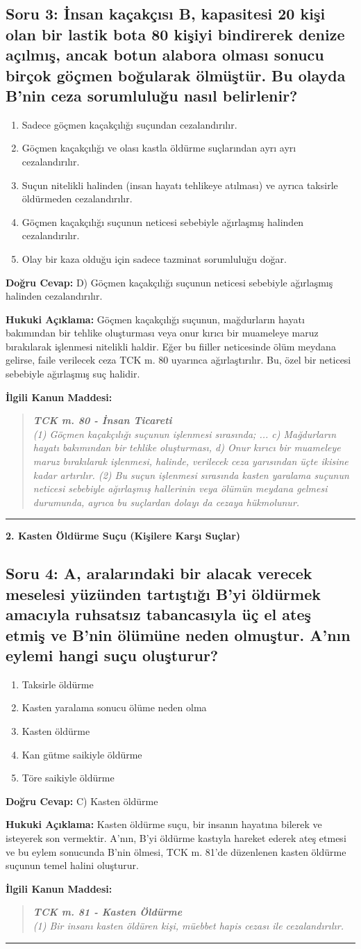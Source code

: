 \documentclass[12pt, a4paper]{article}
\newcommand{\topic}[1]{\par\vspace{4mm}\noindent\large\textbf{#1}\par\vspace{1mm}\nopagebreak}
\newcommand{\question}[1]{\subsection*{#1}}
\newcommand{\options}[5]{
    \begin{enumerate}[label=\Alph*)]
        \item #1
        \item #2
        \item #3
        \item #4
        \item #5
    \end{enumerate}
}
\newcommand{\answer}[3]{
    \vspace{5mm}
    \noindent\textbf{Doğru Cevap:} #1
    \vspace{3mm}
    
    \noindent\textbf{Hukuki Açıklama:} #2
    \vspace{3mm}
    
    \noindent\textbf{İlgili Kanun Maddesi:}
    \begin{quotation}
        \small
        \textit{#3}
    \end{quotation}
    \vspace{5mm}
    \hrule
}
\begin{document}
\question{Soru 3: İnsan kaçakçısı B, kapasitesi 20 kişi olan bir lastik bota 80 kişiyi bindirerek denize açılmış, ancak botun alabora olması sonucu birçok göçmen boğularak ölmüştür. Bu olayda B'nin ceza sorumluluğu nasıl belirlenir?}
\options
{Sadece göçmen kaçakçılığı suçundan cezalandırılır.}
{Göçmen kaçakçılığı ve olası kastla öldürme suçlarından ayrı ayrı cezalandırılır.}
{Suçun nitelikli halinden (insan hayatı tehlikeye atılması) ve ayrıca taksirle öldürmeden cezalandırılır.}
{Göçmen kaçakçılığı suçunun neticesi sebebiyle ağırlaşmış halinden cezalandırılır.}
{Olay bir kaza olduğu için sadece tazminat sorumluluğu doğar.}
\answer{D) Göçmen kaçakçılığı suçunun neticesi sebebiyle ağırlaşmış halinden cezalandırılır.}
{Göçmen kaçakçılığı suçunun, mağdurların hayatı bakımından bir tehlike oluşturması veya onur kırıcı bir muameleye maruz bırakılarak işlenmesi nitelikli haldir. Eğer bu fiiller neticesinde ölüm meydana gelirse, faile verilecek ceza TCK m. 80 uyarınca ağırlaştırılır. Bu, özel bir neticesi sebebiyle ağırlaşmış suç halidir.}
{\textbf{TCK m. 80 - İnsan Ticareti} \\ (1) Göçmen kaçakçılığı suçunun işlenmesi sırasında; ... c) Mağdurların hayatı bakımından bir tehlike oluşturması, d) Onur kırıcı bir muameleye maruz bırakılarak işlenmesi, halinde, verilecek ceza yarısından üçte ikisine kadar artırılır. (2) Bu suçun işlenmesi sırasında kasten yaralama suçunun neticesi sebebiyle ağırlaşmış hallerinin veya ölümün meydana gelmesi durumunda, ayrıca bu suçlardan dolayı da cezaya hükmolunur.}

\topic{2. Kasten Öldürme Suçu (Kişilere Karşı Suçlar)}
\question{Soru 4: A, aralarındaki bir alacak verecek meselesi yüzünden tartıştığı B'yi öldürmek amacıyla ruhsatsız tabancasıyla üç el ateş etmiş ve B'nin ölümüne neden olmuştur. A'nın eylemi hangi suçu oluşturur?}
\options
{Taksirle öldürme}
{Kasten yaralama sonucu ölüme neden olma}
{Kasten öldürme}
{Kan gütme saikiyle öldürme}
{Töre saikiyle öldürme}
\answer{C) Kasten öldürme}
{Kasten öldürme suçu, bir insanın hayatına bilerek ve isteyerek son vermektir. A'nın, B'yi öldürme kastıyla hareket ederek ateş etmesi ve bu eylem sonucunda B'nin ölmesi, TCK m. 81'de düzenlenen kasten öldürme suçunun temel halini oluşturur.}
{\textbf{TCK m. 81 - Kasten Öldürme} \\ (1) Bir insanı kasten öldüren kişi, müebbet hapis cezası ile cezalandırılır.}
\end{document}
